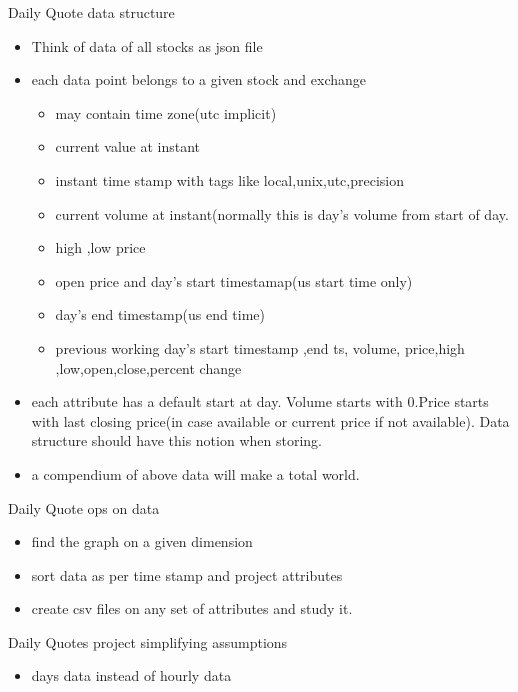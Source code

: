 \documentclass{beamer}
\begin{document}
\begin{frame}{Daily Quote data structure}

    \begin{itemize}
	\item Think of data of all stocks as json file
	\item each data point belongs to a given stock and exchange
    		\begin{itemize}
			\item may contain time zone(utc implicit)
			\item current value at instant
			\item instant time stamp with tags like local,unix,utc,precision
			\item current volume at instant(normally this is day's volume from start of day.
			\item high ,low price
			\item open price and day's start timestamap(us start time only)
			\item day's end timestamp(us end time)
			\item previous working day's start timestamp ,end ts, volume, price,high ,low,open,close,percent change
		\end{itemize}
	\item each attribute has a default start at day. Volume starts with 0.Price starts with last closing price(in case available or current price if not available). Data structure should have this notion when storing. 
	\item a compendium of above data will make a total world. 
	
	\end{itemize}
	
\end{frame}

\begin{frame}{Daily Quote ops on data}

	\begin{itemize}
		\item find the graph on a given dimension
		\item sort data as per time stamp and project attributes 
		\item create csv files on any set of attributes and study it.
	\end{itemize}
\end{frame}


\begin{frame}{Daily Quotes project simplifying assumptions}
	\begin{itemize}
		\item days data instead of hourly data
	
	\end{itemize}
\end{frame}
\end{document}
